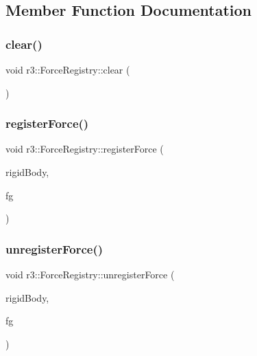\subsection{Member Function Documentation}
\mbox{\label{classr3_1_1_force_registry_ab1c31bc403d998af16df97ff5d42c95f}} 
\subsubsection{\texorpdfstring{clear()}{clear()}}
{\footnotesize\ttfamily void r3\+::\+Force\+Registry\+::clear (\begin{DoxyParamCaption}{ }\end{DoxyParamCaption})}

\mbox{\label{classr3_1_1_force_registry_a2b86303ed6ac2082606b298301f9957c}} 
\subsubsection{\texorpdfstring{register\+Force()}{registerForce()}}
{\footnotesize\ttfamily void r3\+::\+Force\+Registry\+::register\+Force (\begin{DoxyParamCaption}\item[{\mbox{\hyperlink{classr3_1_1_rigid_body}{Rigid\+Body}} $\ast$}]{rigid\+Body,  }\item[{\mbox{\hyperlink{classr3_1_1_force_generator}{Force\+Generator}} $\ast$}]{fg }\end{DoxyParamCaption})}

\mbox{\label{classr3_1_1_force_registry_a3a6163fed4266bd6e18ebad2c5c939cd}} 
\subsubsection{\texorpdfstring{unregister\+Force()}{unregisterForce()}}
{\footnotesize\ttfamily void r3\+::\+Force\+Registry\+::unregister\+Force (\begin{DoxyParamCaption}\item[{\mbox{\hyperlink{classr3_1_1_rigid_body}{Rigid\+Body}} $\ast$}]{rigid\+Body,  }\item[{\mbox{\hyperlink{classr3_1_1_force_generator}{Force\+Generator}} $\ast$}]{fg }\end{DoxyParamCaption})}

